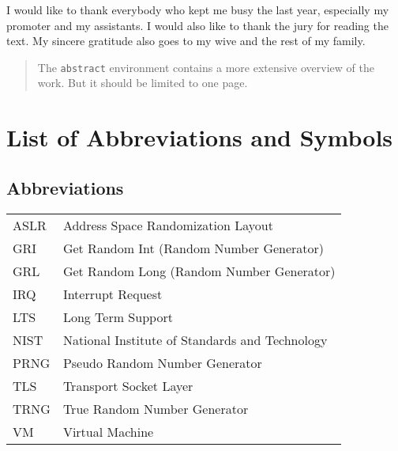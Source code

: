 \documentclass[master=emitm,masteroption=bc,oneside]{kulemt}
\begin{document}
\begin{preface}
  I would like to thank everybody who kept me busy the last year,
  especially my promoter and my assistants. I would also like to thank the
  jury for reading the text. My sincere gratitude also goes to my wive and
  the rest of my family.
\end{preface}



\tableofcontents*

\begin{abstract}
  The \texttt{abstract} environment contains a more extensive overview of
  the work. But it should be limited to one page.

  \lipsum[1]
\end{abstract}

\listoffiguresandtables
\chapter{List of Abbreviations and Symbols}
\section*{Abbreviations}
\begin{flushleft}
  \renewcommand{\arraystretch}{1.1}
  \begin{tabularx}{\textwidth}{@{}p{12mm}X@{}}
    ASLR  & Address Space Randomization Layout \\  	
    GRI   & Get Random Int (Random Number Generator)\\
	GRL	  & Get Random Long (Random Number Generator)\\
	IRQ	  & Interrupt Request \\
	LTS	  & Long Term Support\\
    NIST  & National Institute of Standards and Technology \\
    PRNG  & Pseudo Random Number Generator \\    
	TLS   & Transport Socket Layer \\           
    TRNG  & True Random Number Generator \\ 
    VM	  & Virtual Machine \\
  \end{tabularx}
\end{flushleft}
\end{document}
